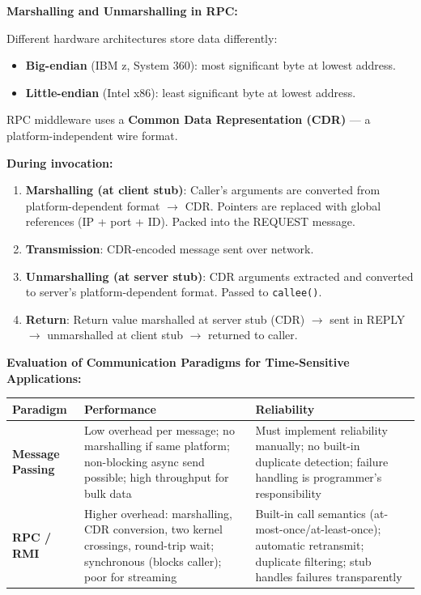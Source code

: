 \documentclass[11pt,a4paper]{article}
\newcommand{\key}[1]{\textbf{\textcolor{keyred}{#1}}}
\begin{document}
\begin{answerbox}
\textbf{Marshalling and Unmarshalling in RPC:}

Different hardware architectures store data differently:
\begin{itemize}
  \item \textbf{Big-endian} (IBM z, System 360): most significant byte at lowest address.
  \item \textbf{Little-endian} (Intel x86): least significant byte at lowest address.
\end{itemize}

RPC middleware uses a \key{Common Data Representation (CDR)} --- a platform-independent wire format.

\textbf{During invocation:}
\begin{enumerate}
  \item \textbf{Marshalling (at client stub)}: Caller's arguments are converted from platform-dependent format $\to$ CDR. Pointers are replaced with global references (IP + port + ID). Packed into the REQUEST message.
  \item \textbf{Transmission}: CDR-encoded message sent over network.
  \item \textbf{Unmarshalling (at server stub)}: CDR arguments extracted and converted to server's platform-dependent format. Passed to \texttt{callee()}.
  \item \textbf{Return}: Return value marshalled at server stub (CDR) $\to$ sent in REPLY $\to$ unmarshalled at client stub $\to$ returned to caller.
\end{enumerate}

\textbf{Evaluation of Communication Paradigms for Time-Sensitive Applications:}

\begin{center}
\begin{tabular}{p{2.8cm}p{5cm}p{5cm}}
\toprule
\textbf{Paradigm} & \textbf{Performance} & \textbf{Reliability} \\
\midrule
\textbf{Message Passing} &
Low overhead per message; no marshalling if same platform; non-blocking async send possible; high throughput for bulk data &
Must implement reliability manually; no built-in duplicate detection; failure handling is programmer's responsibility \\
\addlinespace
\textbf{RPC / RMI} &
Higher overhead: marshalling, CDR conversion, two kernel crossings, round-trip wait; synchronous (blocks caller); poor for streaming &
Built-in call semantics (at-most-once/at-least-once); automatic retransmit; duplicate filtering; stub handles failures transparently \\
\bottomrule
\end{tabular}
\end{center}


\end{answerbox}
\end{document}
